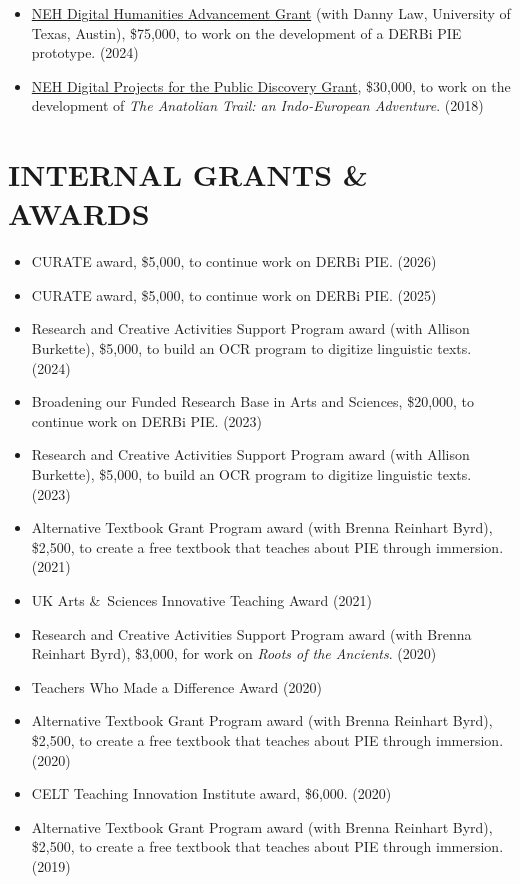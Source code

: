 \documentclass[paper=letter,fontsize=11pt,enabledeprecatedfontcommands]{scrartcl} %
\newcommand{\NewPart}[2]{\section*{\uppercase{#1} #2}}
\begin{document}
\begin{itemize}
\item \href{https://apps.neh.gov/PublicQuery/AwardDetail.aspx?gn=HAA-303944-25}{NEH Digital Humanities Advancement Grant} (with Danny Law, University of Texas, Austin), \$75,000, to work on the development of a DERBi PIE prototype. (2024)
\item \href{https://apps.neh.gov/publicquery/AwardDetail.aspx?gn=MD-263922-19}{NEH Digital Projects for the Public Discovery Grant}, \$30,000, to work on the development of \textit{The Anatolian Trail: an Indo-European Adventure}. (2018)
\end{itemize}


\NewPart{Internal Grants \& Awards}{}
\begin{itemize}
\item CURATE award, \$5,000, to continue work on DERBi PIE. (2026)
\item CURATE award, \$5,000, to continue work on DERBi PIE. (2025)
\item Research and Creative Activities Support Program award (with Allison Burkette), \$5,000, to build an OCR program to digitize linguistic texts. (2024)
\item Broadening our Funded Research Base in Arts and Sciences, \$20,000, to continue work on DERBi PIE. (2023)
\item Research and Creative Activities Support Program award (with Allison Burkette), \$5,000, to build an OCR program to digitize linguistic texts. (2023)
\item Alternative Textbook Grant Program award (with Brenna Reinhart Byrd), \$2,500, to create a free textbook that teaches about PIE through immersion. (2021)
\item UK Arts \&~Sciences Innovative Teaching Award (2021)
\item Research and Creative Activities Support Program award (with Brenna Reinhart Byrd), \$3,000, for work on {\it Roots of the Ancients}. (2020)
\item Teachers Who Made a Difference Award (2020)
\item Alternative Textbook Grant Program award (with Brenna Reinhart Byrd), \$2,500, to create a free textbook that teaches about PIE through immersion. (2020)
\item CELT Teaching Innovation Institute award, \$6,000. (2020)
\item Alternative Textbook Grant Program award (with Brenna Reinhart Byrd), \$2,500, to create a free textbook that teaches about PIE through immersion. (2019)

\end{itemize}
\end{document}
